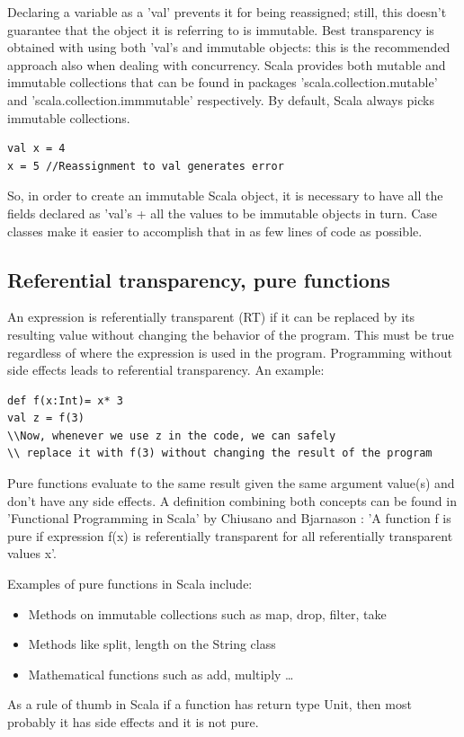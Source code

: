 \documentclass{article}
\begin{document}
Declaring a variable as a 'val' prevents it for being reassigned; still, this doesn't guarantee that the object it is referring to is immutable. Best transparency is obtained with using both 'val's and immutable objects: this is the recommended approach also when dealing with concurrency. Scala provides both mutable and immutable collections that can be found in packages 'scala.collection.mutable' and 'scala.collection.immmutable' respectively. By default, Scala always picks immutable collections. 

\begin{lstlisting} 
val x = 4
x = 5 //Reassignment to val generates error
\end{lstlisting}


So, in order to create an immutable Scala object, it is necessary to have all the fields declared as 'val's + all the values to be immutable objects in turn. Case classes make it easier to accomplish that in as few lines of code as possible.

\subsection {Referential transparency,  pure functions}
An expression is referentially transparent (RT) if it can be replaced by its resulting value without changing the behavior of the program. This must be true regardless of where the expression is used in the program. Programming without side effects leads to referential transparency. An example:

\begin{lstlisting}
def f(x:Int)= x* 3
val z = f(3)
\\Now, whenever we use z in the code, we can safely
\\ replace it with f(3) without changing the result of the program
\end{lstlisting}

Pure functions evaluate to the same result given the same argument value(s) and  don't have any side effects. A definition combining both concepts can be found in 'Functional Programming in Scala' by Chiusano and Bjarnason : 'A function f is pure if expression f(x) is referentially transparent for all referentially transparent values x'.\par
Examples of pure functions in Scala include:
\begin{itemize}
 \item Methods on immutable collections such as map, drop, filter, take
 \item Methods like split, length on the String class
 \item Mathematical functions such as add, multiply \ldots
\end{itemize}
As a rule of thumb in Scala if a function has return type Unit, then most probably it has side effects and it is not pure. \par
\end{document}
